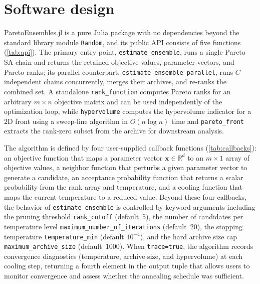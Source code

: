 \documentclass[preprint,review,12pt]{elsarticle}
\begin{document}
\clearpage
\section{Software design}\label{sec:si_software}
ParetoEnsembles.jl is a pure Julia package with no dependencies beyond the standard library module \texttt{Random}, and its public API consists of five functions (\cref{tab:api}).
The primary entry point, \texttt{estimate\_ensemble}, runs a single Pareto SA chain and returns the retained objective values, parameter vectors, and Pareto ranks; its parallel counterpart, \texttt{estimate\_ensemble\_parallel}, runs $C$ independent chains concurrently, merges their archives, and re-ranks the combined set.
A standalone \texttt{rank\_function} computes Pareto ranks for an arbitrary $m \times n$ objective matrix and can be used independently of the optimization loop, while \texttt{hypervolume} computes the hypervolume indicator for a 2D front using a sweep-line algorithm in $O(n \log n)$ time and \texttt{pareto\_front} extracts the rank-zero subset from the archive for downstream analysis.

\begin{sloppypar}
The algorithm is defined by four user-supplied callback functions (\cref{tab:callbacks}): an objective function that maps a parameter vector $\mathbf{x} \in \mathbb{R}^d$ to an $m \times 1$ array of objective values, a neighbor function that perturbs a given parameter vector to generate a candidate, an acceptance probability function that returns a scalar probability from the rank array and temperature, and a cooling function that maps the current temperature to a reduced value.
Beyond these four callbacks, the behavior of \texttt{estimate\_ensemble} is controlled by keyword arguments including the pruning threshold \texttt{rank\_cutoff} (default~5), the number of candidates per temperature level \texttt{maximum\_number\_of\_iterations} (default~20), the stopping temperature \texttt{temperature\_min} (default $10^{-4}$), and the hard archive size cap \texttt{maximum\_archive\_size} (default~1000).
When \texttt{trace=true}, the algorithm records convergence diagnostics (temperature, archive size, and hypervolume) at each cooling step, returning a fourth element in the output tuple that allows users to monitor convergence and assess whether the annealing schedule was sufficient.
\end{sloppypar}
\end{document}
